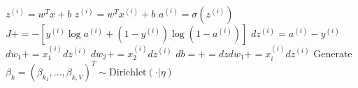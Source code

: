 \documentclass{article}
\begin{document}

\begin{algorithm}
    
  \begin{algorithmic}[1]
        \STATE $z^{(i)} = w^T x + b$
        \STATE $z^{(i)} = w^T x^{(i)} + b$   
        \STATE $a^{(i)} = \sigma(z^{(i)})$ 
        \STATE $J+ = -[y^{(i)} \log a^{(i)} + (1-y^{(i)}) \log(1-a^{(i)})]$   
        \STATE $dz^{(i)} = a^{(i)} - y^{(i)}$ 
        \STATE $dw_1 += x_1^{(i)} dz^{(i)}   $
        \STATE $dw_2 += x_2^{(i)} dz^{(i)}   $
        \STATE $db = += dzdw_1 += x_i^{(i)} dz^{(i)}  $
        \STATE Generate $\beta_k = (\beta_{k_1},\dots,\beta_{k,V})^T \sim \text{Dirichlet}(\cdot\vert\eta)$
      \ENDFOR
  \end{algorithmic}
\end{algorithm}
\end{document}

